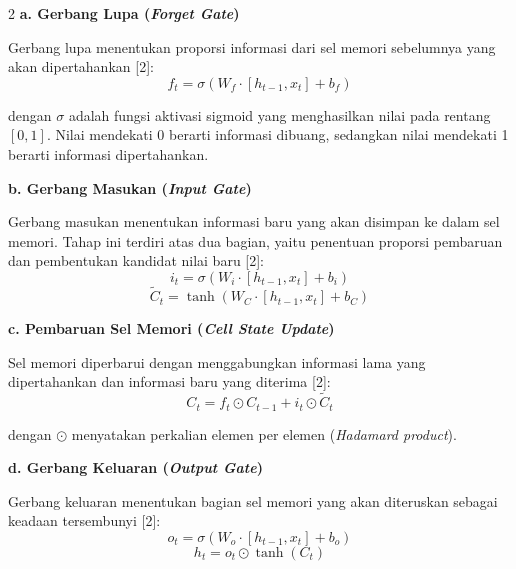 \documentclass[12pt, a4paper, onecolumn, oneside]{report}
\begin{document}
\begin{spacing}{2}
\noindent\textbf{a. Gerbang Lupa (\textit{Forget Gate})}

Gerbang lupa menentukan proporsi informasi dari sel memori sebelumnya yang akan dipertahankan [2]:
\begin{equation}
    f_t = \sigma(W_f \cdot [h_{t-1}, x_t] + b_f)
    \label{eq:gerbang-lupa}
\end{equation}

\noindent dengan $\sigma$ adalah fungsi aktivasi sigmoid yang menghasilkan nilai pada rentang $[0, 1]$. Nilai mendekati 0 berarti informasi dibuang, sedangkan nilai mendekati 1 berarti informasi dipertahankan.

\noindent\textbf{b. Gerbang Masukan (\textit{Input Gate})}

Gerbang masukan menentukan informasi baru yang akan disimpan ke dalam sel memori. Tahap ini terdiri atas dua bagian, yaitu penentuan proporsi pembaruan dan pembentukan kandidat nilai baru [2]:
\begin{equation}
    i_t = \sigma(W_i \cdot [h_{t-1}, x_t] + b_i)
    \label{eq:gerbang-masukan}
\end{equation}
\begin{equation}
    \tilde{C}_t = \tanh(W_C \cdot [h_{t-1}, x_t] + b_C)
    \label{eq:kandidat-sel}
\end{equation}

\noindent\textbf{c. Pembaruan Sel Memori (\textit{Cell State Update})}

Sel memori diperbarui dengan menggabungkan informasi lama yang dipertahankan dan informasi baru yang diterima [2]:
\begin{equation}
    C_t = f_t \odot C_{t-1} + i_t \odot \tilde{C}_t
    \label{eq:pembaruan-sel}
\end{equation}

\noindent dengan $\odot$ menyatakan perkalian elemen per elemen (\textit{Hadamard product}).

\noindent\textbf{d. Gerbang Keluaran (\textit{Output Gate})}

Gerbang keluaran menentukan bagian sel memori yang akan diteruskan sebagai keadaan tersembunyi [2]:
\begin{equation}
    o_t = \sigma(W_o \cdot [h_{t-1}, x_t] + b_o)
    \label{eq:gerbang-keluaran}
\end{equation}
\begin{equation}
    h_t = o_t \odot \tanh(C_t)
    \label{eq:keadaan-tersembunyi}
\end{equation}


\end{spacing}
\end{document}
